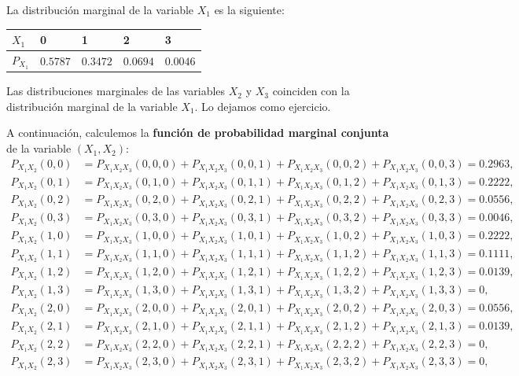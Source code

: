 \documentclass[]{book}
\begin{document}
La distribución marginal de la variable \(X_1\) es la siguiente:

\begin{longtable}[]{@{}lllll@{}}
\toprule
\(X_1\) & 0 & 1 & 2 & 3\tabularnewline
\midrule
\endhead
\(P_{X_1}\) & \(0.5787\) & \(0.3472\) & \(0.0694\) & \(0.0046\)\tabularnewline
\bottomrule
\end{longtable}

Las distribuciones marginales de las variables \(X_2\) y \(X_3\) coinciden con la distribución marginal de la variable \(X_1\). Lo dejamos como ejercicio.

A continuación, calculemos la \textbf{función de probabilidad marginal conjunta} de la variable \((X_1,X_2)\):
\[
\begin{array}{rl}
P_{X_1X_2}(0,0) & = P_{X_1X_2X_3}(0,0,0)+P_{X_1X_2X_3}(0,0,1)+P_{X_1X_2X_3}(0,0,2)+P_{X_1X_2X_3}(0,0,3)=0.2963, \\
P_{X_1X_2}(0,1) & = P_{X_1X_2X_3}(0,1,0)+P_{X_1X_2X_3}(0,1,1)+P_{X_1X_2X_3}(0,1,2)+P_{X_1X_2X_3}(0,1,3)=0.2222, \\
P_{X_1X_2}(0,2) & = P_{X_1X_2X_3}(0,2,0)+P_{X_1X_2X_3}(0,2,1)+P_{X_1X_2X_3}(0,2,2)+P_{X_1X_2X_3}(0,2,3)=0.0556, \\
P_{X_1X_2}(0,3) & = P_{X_1X_2X_3}(0,3,0)+P_{X_1X_2X_3}(0,3,1)+P_{X_1X_2X_3}(0,3,2)+P_{X_1X_2X_3}(0,3,3)=0.0046, \\
P_{X_1X_2}(1,0) & = P_{X_1X_2X_3}(1,0,0)+P_{X_1X_2X_3}(1,0,1)+P_{X_1X_2X_3}(1,0,2)+P_{X_1X_2X_3}(1,0,3)=0.2222, \\
P_{X_1X_2}(1,1) & = P_{X_1X_2X_3}(1,1,0)+P_{X_1X_2X_3}(1,1,1)+P_{X_1X_2X_3}(1,1,2)+P_{X_1X_2X_3}(1,1,3)=0.1111, \\
P_{X_1X_2}(1,2) & = P_{X_1X_2X_3}(1,2,0)+P_{X_1X_2X_3}(1,2,1)+P_{X_1X_2X_3}(1,2,2)+P_{X_1X_2X_3}(1,2,3)=0.0139, \\
P_{X_1X_2}(1,3) & = P_{X_1X_2X_3}(1,3,0)+P_{X_1X_2X_3}(1,3,1)+P_{X_1X_2X_3}(1,3,2)+P_{X_1X_2X_3}(1,3,3)=0, \\
P_{X_1X_2}(2,0) & = P_{X_1X_2X_3}(2,0,0)+P_{X_1X_2X_3}(2,0,1)+P_{X_1X_2X_3}(2,0,2)+P_{X_1X_2X_3}(2,0,3)=0.0556, \\
P_{X_1X_2}(2,1) & = P_{X_1X_2X_3}(2,1,0)+P_{X_1X_2X_3}(2,1,1)+P_{X_1X_2X_3}(2,1,2)+P_{X_1X_2X_3}(2,1,3)=0.0139, \\
P_{X_1X_2}(2,2) & = P_{X_1X_2X_3}(2,2,0)+P_{X_1X_2X_3}(2,2,1)+P_{X_1X_2X_3}(2,2,2)+P_{X_1X_2X_3}(2,2,3)=0, \\
P_{X_1X_2}(2,3) & = P_{X_1X_2X_3}(2,3,0)+P_{X_1X_2X_3}(2,3,1)+P_{X_1X_2X_3}(2,3,2)+P_{X_1X_2X_3}(2,3,3)=0, \\
\end{array}
\]
\end{document}
